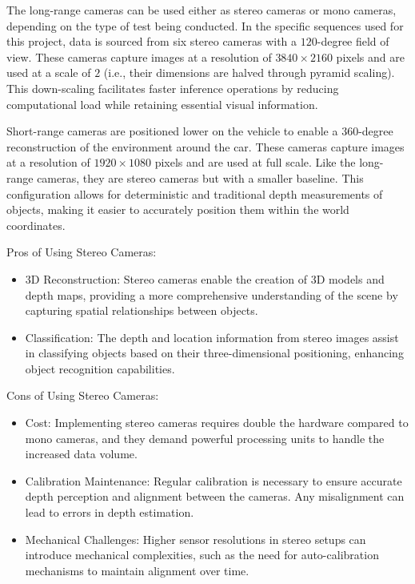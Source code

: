 The long-range cameras can be used either as stereo cameras or mono cameras, depending on the type of test being conducted. In the specific sequences used for this project, data is sourced from six stereo cameras with a $120$-degree field of view. These cameras capture images at a resolution of $3840 \times 2160$ pixels and are used at a scale of $2$ (i.e., their dimensions are halved through pyramid scaling). This down-scaling facilitates faster inference operations by reducing computational load while retaining essential visual information.

Short-range cameras are positioned lower on the vehicle to enable a $360$-degree reconstruction of the environment around the car. These cameras capture images at a resolution of $1920 \times 1080$ pixels and are used at full scale. Like the long-range cameras, they are stereo cameras but with a smaller baseline. This configuration allows for deterministic and traditional depth measurements of objects, making it easier to accurately position them within the world coordinates.

Pros of Using Stereo Cameras:
\begin{itemize}
    \item 3D Reconstruction: Stereo cameras enable the creation of 3D models and depth maps, providing a more comprehensive understanding of the scene by capturing spatial relationships between objects.
    \item Classification: The depth and location information from stereo images assist in classifying objects based on their three-dimensional positioning, enhancing object recognition capabilities.
\end{itemize}

Cons of Using Stereo Cameras:
\begin{itemize}
    \item Cost: Implementing stereo cameras requires double the hardware compared to mono cameras, and they demand powerful processing units to handle the increased data volume.
    \item Calibration Maintenance: Regular calibration is necessary to ensure accurate depth perception and alignment between the cameras. Any misalignment can lead to errors in depth estimation.
    \item Mechanical Challenges: Higher sensor resolutions in stereo setups can introduce mechanical complexities, such as the need for auto-calibration mechanisms to maintain alignment over time.
\end{itemize}

